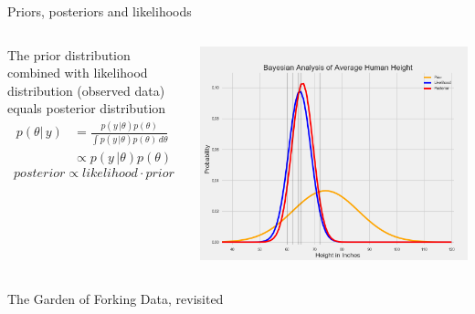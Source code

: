 \documentclass[12pt, aspectratio=149]{beamer}
\theoremstyle{plain}
\begin{document}
\begin{frame}[fragile]{Priors, posteriors and likelihoods}
	\begin{columns}
		\begin{column}{0.5\linewidth}
			The prior distribution combined with likelihood distribution (observed data) equals posterior distribution
			\begin{equation*}
			\begin{split}
			p(\theta \vert \, y) & =  \frac{p(y \, \vert \theta)p(\theta)}{\int p(y \, \vert \theta)p(\theta) \, d\theta} \\
			& \propto p(y \, \vert \theta)p(\theta)
			\end{split}
			\end{equation*}
			\begin{equation*}
			posterior \propto likelihood \cdot prior
			\end{equation*}
		\end{column}
		\begin{column}{0.5\linewidth}
			\includegraphics[scale=0.17]{figs/prior_likelihood_posterior_example.png}
		\end{column}
	\end{columns}
\end{frame}

\begin{frame}[fragile]{The Garden of Forking Data, revisited}
	\inputminted[fontsize=\tiny]{python}{../marbles.py}
\end{frame}
\end{document}
